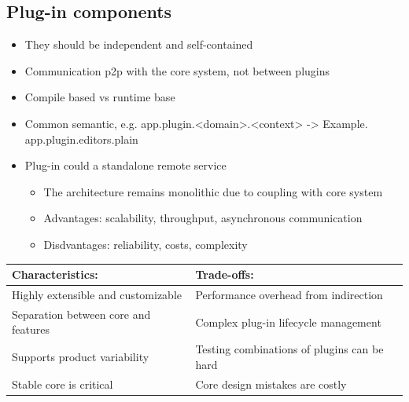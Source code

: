 \subsection{Plug-in components}
\begin{itemize}
  \item They should be independent and self-contained
  \item Communication p2p with the core system, not between plugins
  \item Compile based vs runtime base
  \item Common semantic, e.g. app.plugin.<domain>.<context> -> Example. app.plugin.editors.plain
  \item Plug-in could a standalone remote service
        \begin{itemize}
          \item The architecture remains monolithic due to coupling with core system
          \item Advantages: scalability, throughput, asynchronous communication
          \item Disdvantages: reliability, costs, complexity
        \end{itemize}
\end{itemize}

\begin{table}[h!]
  \renewcommand{\arraystretch}{1.4}
  \centering
  \begin{tabular}{l l}
    \toprule
    \textbf{Characteristics:}            & \textbf{Trade-offs:}                        \\
    \midrule
    Highly extensible and customizable   & Performance overhead from indirection       \\
    Separation between core and features & Complex plug-in lifecycle management        \\
    Supports product variability         & Testing combinations of plugins can be hard \\
    Stable core is critical              & Core design mistakes are costly             \\
    \bottomrule
  \end{tabular}
\end{table}


